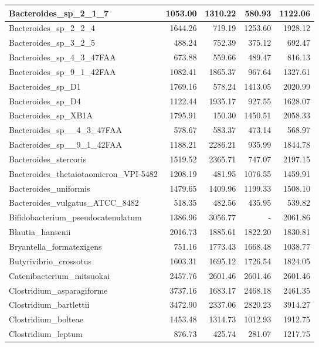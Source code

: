 \documentclass[12pt,a4paper]{article}
\begin{document}
\begin{table}[ht]
\begin{center}
\begin{tabular}{|l*{4}{|r}|}
Bacteroides\_sp\_2\_1\_7 & 1053.00 & 1310.22 & 580.93 & 1122.06 \\ \hline
Bacteroides\_sp\_2\_2\_4 & 1644.26 & 719.19 & 1253.60 & 1928.12 \\ \hline
Bacteroides\_sp\_3\_2\_5 & 488.24 & 752.39 & 375.12 & 692.47 \\ \hline
Bacteroides\_sp\_4\_3\_47FAA & 673.88 & 559.66 & 489.47 & 816.13 \\ \hline
Bacteroides\_sp\_9\_1\_42FAA & 1082.41 & 1865.37 & 967.64 & 1327.61 \\ \hline
Bacteroides\_sp\_D1 & 1769.16 & 578.24 & 1413.05 & 2020.99 \\ \hline
Bacteroides\_sp\_D4 & 1122.44 & 1935.17 & 927.55 & 1628.07 \\ \hline
Bacteroides\_sp\_XB1A & 1795.91 & 150.30 & 1450.51 & 2058.33 \\ \hline
Bacteroides\_sp\_\_4\_3\_47FAA & 578.67 & 583.37 & 473.14 & 568.97 \\ \hline
Bacteroides\_sp\_\_9\_1\_42FAA & 1188.21 & 2286.21 & 935.99 & 1844.78 \\ \hline
Bacteroides\_stercoris & 1519.52 & 2365.71 & 747.07 & 2197.15 \\ \hline
Bacteroides\_thetaiotaomicron\_VPI-5482 & 1208.19 & 481.95 & 1076.55 & 1459.91 \\ \hline
Bacteroides\_uniformis & 1479.65 & 1409.96 & 1199.33 & 1508.10 \\ \hline
Bacteroides\_vulgatus\_ATCC\_8482 & 518.35 & 482.56 & 435.95 & 539.82 \\ \hline
Bifidobacterium\_pseudocatenulatum & 1386.96 & 3056.77 & - & 2061.86 \\ \hline
Blautia\_hansenii & 2016.73 & 1885.61 & 1822.20 & 1830.81 \\ \hline
Bryantella\_formatexigens & 751.16 & 1773.43 & 1668.48 & 1038.77 \\ \hline
Butyrivibrio\_crossotus & 1603.31 & 1695.12 & 1726.54 & 1824.05 \\ \hline
Catenibacterium\_mitsuokai & 2457.76 & 2601.46 & 2601.46 & 2601.46 \\ \hline
Clostridium\_asparagiforme & 3737.16 & 1683.17 & 2468.18 & 2461.35 \\ \hline
Clostridium\_bartlettii & 3472.90 & 2337.06 & 2820.23 & 3914.27 \\ \hline
Clostridium\_bolteae & 1453.48 & 1314.73 & 1012.93 & 1912.75 \\ \hline
Clostridium\_leptum & 876.73 & 425.74 & 281.07 & 1217.75 \\ \hline

\end{tabular}
\end{center}
\end{table}
\end{document}
